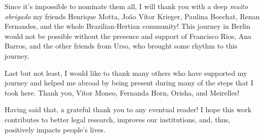 \documentclass[
  12pt,
]{article}
\begin{document}
Since it's impossible to nominate them all, I will thank you with a deep
\emph{muito obrigado} my friends Henrique Motta, João Vítor Krieger,
Paulina Boechat, Renan Fernandes, and the whole Brazilian-Hertian
community! This journey in Berlin would not be possible without the
presence and support of Francisco Rios, Ana Barros, and the other
friends from Urso, who brought some rhythm to this journey.

Last but not least, I would like to thank many others who have supported
my journey and helped me abroad by being present during many of the
steps that I took here. Thank you, Vitor Moneo, Fernanda Horn, Orisha,
and Meirelles!

Having said that, a grateful thank you to any eventual reader! I hope
this work contributes to better legal research, improves our
institutions, and, thus, positively impacts people's lives.
\end{document}
